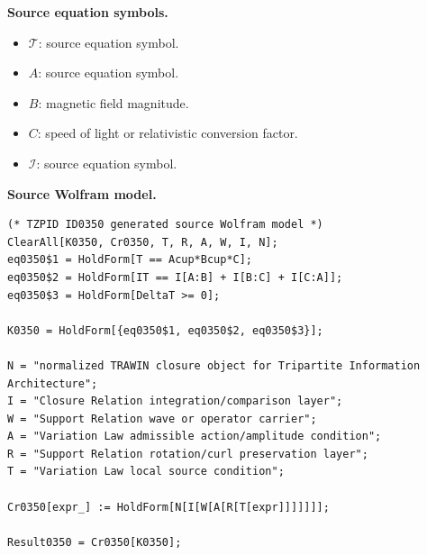 \begin{minipage}[t]{0.49\linewidth}
\begingroup
\small
\raggedright
\textbf{Source equation symbols.}\par
\begin{itemize}[leftmargin=1.35em,itemsep=1pt,topsep=1pt,parsep=0pt]
    \item $\mathcal{T}$: source equation symbol.
    \item $A$: source equation symbol.
    \item $B$: magnetic field magnitude.
    \item $C$: speed of light or relativistic conversion factor.
    \item $\mathcal{I}$: source equation symbol.
\end{itemize}
\endgroup
\end{minipage}\hfill
\begin{minipage}[t]{0.47\linewidth}
\begingroup
\scriptsize
\raggedright
\textbf{Source Wolfram model.}\par
\begin{Verbatim}[fontsize=\tiny,breaklines=true,breakanywhere=true]
(* TZPID ID0350 generated source Wolfram model *)
ClearAll[K0350, Cr0350, T, R, A, W, I, N];
eq0350$1 = HoldForm[T == Acup*Bcup*C];
eq0350$2 = HoldForm[IT == I[A:B] + I[B:C] + I[C:A]];
eq0350$3 = HoldForm[DeltaT >= 0];

K0350 = HoldForm[{eq0350$1, eq0350$2, eq0350$3}];

N = "normalized TRAWIN closure object for Tripartite Information Architecture";
I = "Closure Relation integration/comparison layer";
W = "Support Relation wave or operator carrier";
A = "Variation Law admissible action/amplitude condition";
R = "Support Relation rotation/curl preservation layer";
T = "Variation Law local source condition";

Cr0350[expr_] := HoldForm[N[I[W[A[R[T[expr]]]]]]];

Result0350 = Cr0350[K0350];
\end{Verbatim}
\endgroup
\end{minipage}

